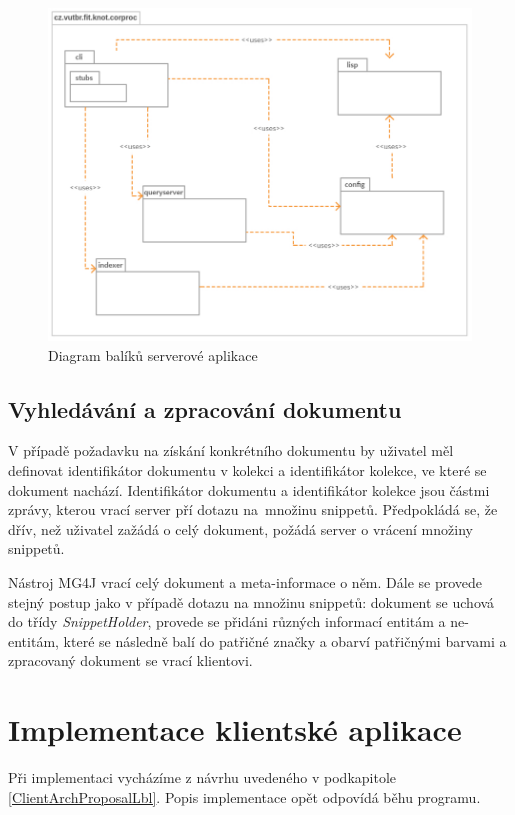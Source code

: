 \begin{figure}[ht]
	\includegraphics[scale=0.5]{obrazky-figures/ServerPackageDiagram.png}
    \caption{Diagram balíků serverové aplikace}
    \label{ServerApplicationLbl}
\end{figure}




\subsection{Vyhledávání a zpracování dokumentu}
V případě požadavku na získání konkrétního  dokumentu by uživatel měl definovat identifikátor dokumentu v kolekci a identifikátor kolekce, ve které se dokument nachází. Identifikátor dokumentu a identifikátor kolekce jsou částmi zprávy, kterou vrací server pří dotazu na~množinu snippetů. Předpokládá se, že dřív, než uživatel zažádá o celý dokument, požádá server o vrácení množiny snippetů.

Nástroj MG4J vrací celý dokument a meta-informace o něm. Dále se provede stejný postup jako v případě dotazu na množinu snippetů: dokument se uchová do třídy \emph{SnippetHolder}, provede se přidáni různých informací entitám a ne-entitám, které se následně balí do patřičné značky a obarví patřičnými barvami a zpracovaný dokument se vrací klientovi.  

\section{Implementace klientské aplikace}
Při implementaci vycházíme z návrhu uvedeného v podkapitole \ref{ClientArchProposalLbl}. Popis implementace opět odpovídá běhu programu.

